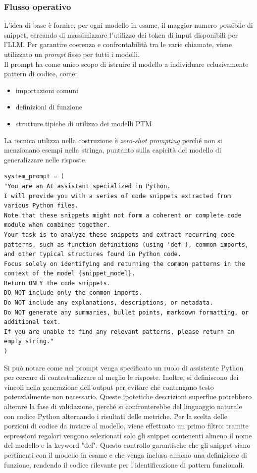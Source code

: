 \documentclass{article}
\begin{document}
\subsubsection{Flusso operativo}
L'idea di base è fornire, per ogni modello in esame, il maggior numero possibile di snippet, cercando di massimizzare l’utilizzo dei token di input disponibili per l’LLM. Per garantire coerenza e confrontabilità tra le varie chiamate, viene utilizzato un \textit{prompt} fisso per tutti i modelli. \\
Il prompt ha come unico scopo di istruire il modello a individuare eclusivamente pattern di codice, come:
\begin{itemize}
    \item importazioni comuni
    \item definizioni di funzione
    \item strutture tipiche di utilizzo dei modelli PTM
\end{itemize}
La tecnica utilizza nella costruzione è \textit{zero-shot prompting} perché non si menzionano esempi nella stringa, puntanto sulla capicità del modello di generalizzare nelle risposte.
\begin{lstlisting}[]
system_prompt = (
"You are an AI assistant specialized in Python.
I will provide you with a series of code snippets extracted from various Python files.
Note that these snippets might not form a coherent or complete code module when combined together.
Your task is to analyze these snippets and extract recurring code patterns, such as function definitions (using 'def'), common imports, and other typical structures found in Python code.
Focus solely on identifying and returning the common patterns in the context of the model {snippet_model}.
Return ONLY the code snippets.
DO NOT include only the common imports.
Do NOT include any explanations, descriptions, or metadata.
Do NOT generate any summaries, bullet points, markdown formatting, or additional text.
If you are unable to find any relevant patterns, please return an empty string."
)    
\end{lstlisting}
Si può notare come nel prompt venga specificato un ruolo di assistente Python per cercare di contestualizzare al meglio le risposte. Inoltre, si definiscono dei vincoli nella generazione dell'output per evitare che contengano testo potenzialmente non necessario. Queste ipotetiche descrizioni superflue potrebbero alterare la fase di validazione, perché si confronterebbe del linguaggio naturale con codice Python alternando i risultati delle metriche.
Per la scelta delle porzioni di codice da inviare al modello, viene effettuato un primo filtro: tramite espressioni regolari vengono selezionati solo gli snippet contenenti almeno il nome del modello e la keyword "def". Questo controllo garantische che gli snippet siano pertinenti con il modello in esame e che venga inclusa almeno una definizione di funzione, rendendo il codice rilevante per l'identificazione di pattern funzionali.\\
\end{document}
